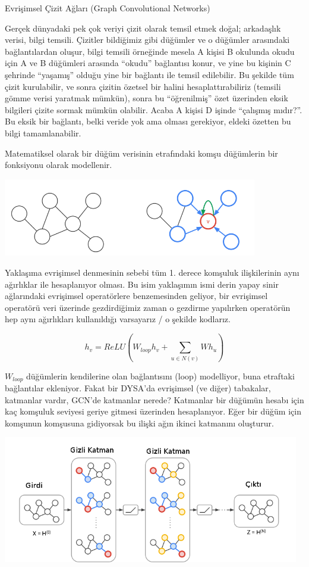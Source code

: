 \documentclass[12pt,fleqn]{article}\usepackage{../../common}
\begin{document}
Evrişimsel Çizit Ağları (Graph Convolutional Networks)

Gerçek dünyadaki pek çok veriyi çizit olarak temsil etmek doğal; arkadaşlık
verisi, bilgi temsili. Çizitler bildiğimiz gibi düğümler ve o düğümler
arasındaki bağlantılardan oluşur, bilgi temsili örneğinde mesela A kişisi B
okulunda okudu için A ve B düğümleri arasında ``okudu'' bağlantısı konur,
ve yine bu kişinin C şehrinde ``yaşamış'' olduğu yine bir bağlantı ile
temsil edilebilir. Bu şekilde tüm çizit kurulabilir, ve sonra çizitin
özetsel bir halini hesaplattırabiliriz (temsili gömme verisi yaratmak
mümkün), sonra bu ``öğrenilmiş'' özet üzerinden eksik bilgileri çizite
sormak mümkün olabilir. Acaba A kişisi D işinde ``çalışmış mıdır?''. Bu
eksik bir bağlantı, belki veride yok ama olması gerekiyor, eldeki özetten
bu bilgi tamamlanabilir. 

Matematiksel olarak bir düğüm verisinin etrafındaki komşu düğümlerin bir
fonksiyonu olarak modellenir.

\includegraphics[width=30em]{graphconv_02.png}

Yaklaşıma evrişimsel denmesinin sebebi tüm 1. derece komşuluk ilişkilerinin
aynı ağırlıklar ile hesaplanıyor olması. Bu isim yaklaşımın ismi derin
yapay sinir ağlarındaki evrişimsel operatörlere benzemesinden geliyor, bir
evrişimsel operatörü veri üzerinde gezdirdiğimiz zaman o gezdirme
yapılırken operatörün hep aynı ağırlıkları kullanıldığı varsayarız / o
şekilde kodlarız.

$$ h_v = ReLU(W_{loop}h_v + \sum _{u \in N(v)} W h_u ) $$

$W_{loop}$ düğümlerin kendilerine olan bağlantısını (loop) modelliyor, buna
etraftaki bağlantılar ekleniyor. Fakat bir DYSA'da evrişimsel (ve diğer)
tabakalar, katmanlar vardır, GCN'de katmanlar nerede? Katmanlar bir düğümün
hesabı için kaç komşuluk seviyesi geriye gitmesi üzerinden
hesaplanıyor. Eğer bir düğüm için komşunun komşusuna gidiyorsak bu ilişki
ağın ikinci katmanını oluşturur.

\includegraphics[width=35em]{graphconv_01.png}
\end{document}
